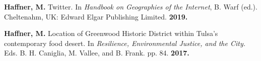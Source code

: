 

\begin{cventries}
   \cventry
      {}
      {}
      {}
      {}
      {
        \begin{cvitems}
          \vspace{-4mm}
        \item {\textbf{Haffner, M.} Twitter. In \textit{Handbook on Geographies
              of the Internet}, B. Warf (ed.). Cheltenahm, UK: Edward Elgar
            Publishing Limited. \textbf{2019.}} \\
        \end{cvitems} 
    }

\end{cventries}



\begin{cventries}
   \cventry
      {}
      {}
      {}
      {}
      {
        \begin{cvitems}
          \vspace{-4mm}
        \item {\textbf{Haffner, M.} Location of Greenwood Historic District
            within Tulsa's contemporary food desert. In \textit{Resilience,
              Environmental Justice, and the City.} Eds. B. H. Caniglia, M.
            Vallee, and B.
            Frank. pp. 84. \textbf{2017.}} \\
          \vspace{-2mm}
        \end{cvitems}
    }

\end{cventries}